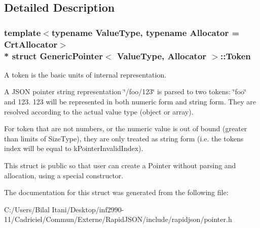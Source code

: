 \subsection{Detailed Description}
\subsubsection*{template$<$typename Value\+Type, typename Allocator = Crt\+Allocator$>$\\*
struct Generic\+Pointer$<$ Value\+Type, Allocator $>$\+::\+Token}

A token is the basic units of internal representation. 

A J\+S\+ON pointer string representation \char`\"{}/foo/123\char`\"{} is parsed to two tokens\+: \char`\"{}foo\char`\"{} and 123. 123 will be represented in both numeric form and string form. They are resolved according to the actual value type (object or array).

For token that are not numbers, or the numeric value is out of bound (greater than limits of Size\+Type), they are only treated as string form (i.\+e. the token\textquotesingle{}s index will be equal to k\+Pointer\+Invalid\+Index).

This struct is public so that user can create a Pointer without parsing and allocation, using a special constructor. 

The documentation for this struct was generated from the following file\+:\begin{DoxyCompactItemize}
\item 
C\+:/\+Users/\+Bilal Itani/\+Desktop/inf2990-\/11/\+Cadriciel/\+Commun/\+Externe/\+Rapid\+J\+S\+O\+N/include/rapidjson/pointer.\+h\end{DoxyCompactItemize}
